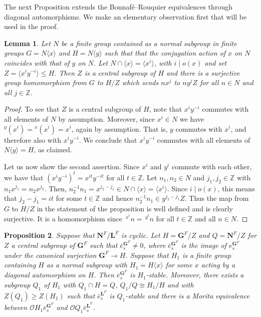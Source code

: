 \documentclass{amsart}
\theoremstyle{plain}\newtheorem{Theorem}{Theorem}[section]
\theoremstyle{plain}\newtheorem{Conjecture}[Theorem]{Conjecture}
\theoremstyle{plain}\newtheorem{Corollary}[Theorem]{Corollary}
\theoremstyle{plain}\newtheorem{Lemma}[Theorem]{Lemma}
\theoremstyle{plain}\newtheorem{Proposition}[Theorem]{Proposition}
\theoremstyle{definition}\newtheorem{Definition}[Theorem]{Definition}
\theoremstyle{definition}\newtheorem{Example}[Theorem]{Example}
\theoremstyle{definition}\newtheorem{Examples}[Theorem]{Examples}
\theoremstyle{definition}\newtheorem{Exercise}[Theorem]{Exercise}
\theoremstyle{definition}\newtheorem{Notation}[Theorem]{Notation}
\theoremstyle{definition}\newtheorem{Remark}[Theorem]{Remark}
\theoremstyle{definition}\newtheorem{Remarks}[Theorem]{Remarks}
\def\CO{{\mathcal{O}}}    \def\OPE{{\mathcal{O}(P\rtimes E)}}
\newcommand{\bG}{{\mathbf{G}}}
\newcommand{\bL}{{\mathbf{L}}}
\newcommand{\bN}{{\mathbf{N}}}
\numberwithin{equation}{section}
\begin{document}
The next Proposition extends  the Bonnaf\'e--Rouquier equivalences through   diagonal automorphisms. We make an elementary observation first that will be used in the proof.


\begin{Lemma} \label{lem:extensions}  Let  $N$  be  a finite group contained as a normal subgroup in finite groups $G =N \langle x\rangle $ and $H = N \langle  y \rangle$  such that that the conjugation action of $x$ on $N$  coincides with that of $y$  on $N$.    Let  $ N \cap \langle x \rangle  = \langle x^i \rangle $, with $ i \mid o(x)$  and set  $Z = \langle  x^i y^{-i}  \rangle \leq H $. Then  $Z$   is a   central subgroup  of $H$ and there is a surjective group homomorphism from   $ G$  to $H/Z$ which sends $n x^j$  to $n  y^j  Z$ for all $ n\in N $ and  all  $ j \in {\mathbb Z} $.
\end{Lemma}


\begin{proof}  
To see that $Z$ is a central subgroup of $H$, note that $x^iy^{-i}$ commutes with all elements of $N$ by assumption. Moreover, since $x^i\in N$ we have $^y(x^i)={^x(x^i)}=x^i$, again by assumption. That is, $y$ commutes with $x^i$, and therefore also with $x^iy^{-i}$. We conclude that $x^iy^{-i}$ commutes with all elements of $N\langle y\rangle=H$, as claimed.

Let us now show the second assertion. Since  $ x^i $ and  $y^i$  commute with each other, we have that $ (x^i y^{-i})^t =  x^{it} y^{-it} $   for all  $t \in {\mathbb Z}$.
Let $n_1, n_2 \in N $  and  $ j_1, j_2 \in {\mathbb Z}$   with  $n_1 x^{j_1} = n_2  x^{j_2} $. Then,   $n_2^{-1} n_1  = x^{j_2 -j_1}  \in  N \cap   \langle x \rangle =  \langle x^ i \rangle  $.  Since $ i \mid o(x)$, this means that $j_2- j_1  = i t $ for some $ t\in {\mathbb Z}$  and hence $n_2^{-1} n_1   \in    y^{j_2- j_1}  Z $. Thus the map from  $G$  to $H/Z$ in the statement of the proposition is well defined  and is clearly surjective.    It is a  homomorphism  since  $\,^{x^t} n  =  \,^{y^t} n $ for all $ t \in {\mathbb Z}$ and all $n \in N$.
\end{proof}




\begin{Proposition} \label{prop:diag2} Suppose that   $\bN^F/\bL^F $ is  cyclic.   Let   $H  =\bG^F/Z$  and  $Q= \bN^F/Z$  for   $Z$  a central subgroup of $\bG^F$  such that $ \bar e_s^{\bG^F} \ne 0  $, where   $\bar e_s^{\bG^F}$  is  the   image of   $e_s^{\bG^F} $  under the canonical surjection $\bG^F \to H $.   Suppose that  $H_1 $ is a  finite group  containing $H$ as a normal subgroup with $H_1= H \langle x\rangle $  for some $x$ acting by  a diagonal   automorphism on   $H$.
 Then $\bar  e_s^{\bG^F} $  is  $H_1$-stable. Moreover,
there exists 
 a  subgroup $Q_1 $  of $H_1 $  with $ Q_1 \cap H  =Q  $,  $Q_1/Q \cong  H_1/H$   and with  $Z(Q_1) \geq  Z(H_1) $   such that $\bar e_s^{\bL^F}$ is $Q_1$-stable  and  there is a Morita equivalence between $\CO H_1\bar e_{s}^{\bG^F}$ and $\CO Q_1 \bar e_{s}^{\bL^F}$.  
  \end{Proposition} 
\end{document}
